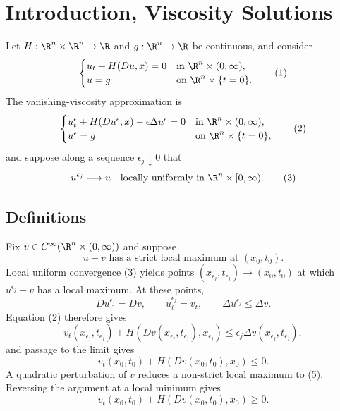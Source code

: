 
\section{Introduction, Viscosity Solutions}
\label{sec:hj-introduction-viscosity-solutions}

Let $H:\R^n\times\R^n\to\R$ and $g:\R^n\to\R$ be continuous, and consider
\[
\begin{cases}
u_t+H(Du,x)=0 & \text{in }\R^n\times(0,\infty),\\
u=g & \text{on }\R^n\times\{t=0\}.
\end{cases}
\tag{1}
\]
The vanishing-viscosity approximation is
\[
\begin{cases}
u_t^\epsilon+H(Du^\epsilon,x)-\epsilon\Delta u^\epsilon=0
& \text{in }\R^n\times(0,\infty),\\
u^\epsilon=g & \text{on }\R^n\times\{t=0\},
\end{cases}
\tag{2}
\]
and suppose along a sequence $\epsilon_j\downarrow0$ that
\[
u^{\epsilon_j}\longrightarrow u
\quad\text{locally uniformly in }\R^n\times[0,\infty).
\tag{3}
\]

\subsection{Definitions}

\begin{remark}
\label{rem:hj-viscosity-solution-motivation}
Fix $v\in C^\infty(\R^n\times(0,\infty))$ and suppose
\[
u-v\text{ has a strict local maximum at }(x_0,t_0).
\tag{5}
\]
Local uniform convergence (3) yields points $(x_{\epsilon_j},t_{\epsilon_j})\to(x_0,t_0)$ at which $u^{\epsilon_j}-v$ has a local maximum. At these points,
\[
Du^{\epsilon_j}=Dv,
\qquad
u_t^{\epsilon_j}=v_t,
\qquad
\Delta u^{\epsilon_j}\leq\Delta v.
\]
Equation (2) therefore gives
\[
v_t(x_{\epsilon_j},t_{\epsilon_j})
+H(Dv(x_{\epsilon_j},t_{\epsilon_j}),x_{\epsilon_j})
\leq\epsilon_j\Delta v(x_{\epsilon_j},t_{\epsilon_j}),
\tag{11}
\]
and passage to the limit gives
\[
v_t(x_0,t_0)+H(Dv(x_0,t_0),x_0)\leq0.
\tag{12}
\]
A quadratic perturbation of $v$ reduces a non-strict local maximum to (5). Reversing the argument at a local minimum gives
\[
v_t(x_0,t_0)+H(Dv(x_0,t_0),x_0)\geq0.
\tag{14}
\]
\end{remark}

